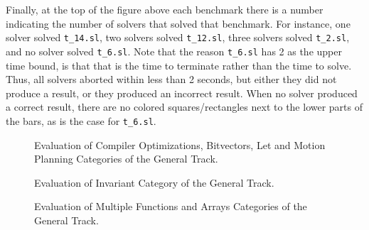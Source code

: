 Finally, at the top of the figure above each benchmark there is a number indicating the number of solvers that solved that benchmark. For instance, one solver solved \texttt{t\_14.sl}, two solvers solved \texttt{t\_12.sl}, three solvers solved \texttt{t\_2.sl}, and no solver solved \texttt{t\_6.sl}. Note that the reason \texttt{t\_6.sl} has 2 as the upper time bound, is that that is the time to terminate rather than the time to solve. Thus, all solvers aborted within less than 2 seconds, but either they did not produce a result, or they produced an incorrect result. When no solver produced a correct result, there are no colored squares/rectangles next to the lower parts of the bars, as is the case for \texttt{t\_6.sl}.


\begin{figure*}
\noindent{}
	\caption{Evaluation of Compiler Optimizations, Bitvectors, Let and Motion Planning Categories of the General Track.}\label{fig:let-mot-plan}
\end{figure*}



\begin{figure*}
\noindent{}
	\caption{Evaluation of Invariant Category of the General Track.}\label{fig:inv-results}
\end{figure*}
		
		

		
		
\begin{figure*}
\noindent{}
\caption{Evaluation of Multiple Functions and Arrays Categories of the General Track.}\label{fig:mult-func-arr}
\end{figure*}

